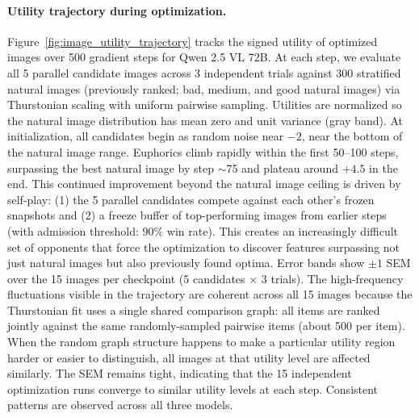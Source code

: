 \paragraph{Utility trajectory during optimization.}

Figure~\ref{fig:image_utility_trajectory} tracks the signed utility of optimized images over 500 gradient steps for Qwen 2.5 VL 72B. At each step, we evaluate all 5 parallel candidate images across 3 independent trials against 300 stratified natural images (previously ranked; bad, medium, and good natural images) via Thurstonian scaling with uniform pairwise sampling. Utilities are normalized so the natural image distribution has mean zero and unit variance (gray band). At initialization, all candidates begin as random noise near $-2$, near the bottom of the natural image range. Euphorics climb rapidly within the first 50--100 steps, surpassing the best natural image by step $\sim$75 and plateau around $+4.5$ in the end. This continued improvement beyond the natural image ceiling is driven by self-play: (1) the 5 parallel candidates compete against each other's frozen snapshots and (2) a freeze buffer of top-performing images from earlier steps (with admission threshold: $90\%$ win rate). This creates an increasingly difficult set of opponents that force the optimization to discover features surpassing not just natural images but also previously found optima. Error bands show $\pm 1$ SEM over the 15 images per checkpoint (5 candidates $\times$ 3 trials). The high-frequency fluctuations visible in the trajectory are coherent across all 15 images because the Thurstonian fit uses a single shared comparison graph: all items are ranked jointly against the same randomly-sampled pairwise items (about 500 per item). When the random graph structure happens to make a particular utility region harder or easier to distinguish, all images at that utility level are affected similarly. The SEM remains tight, indicating that the 15 independent optimization runs converge to similar utility levels at each step. Consistent patterns are observed across all three models.

